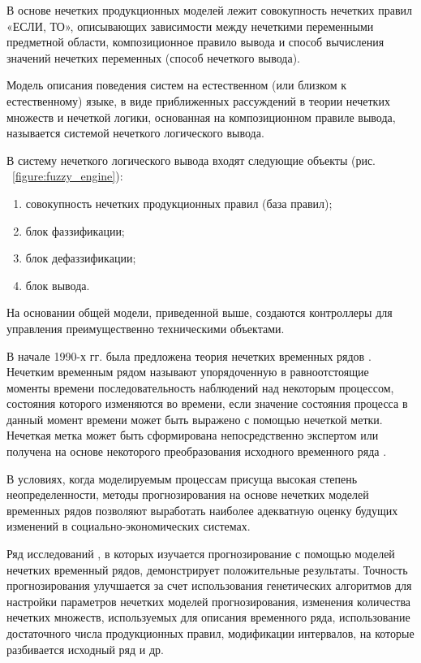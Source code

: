 В основе нечетких продукционных моделей лежит совокупность нечетких правил «ЕСЛИ, ТО», 
описывающих зависимости между нечеткими переменными предметной области, 
композиционное правило вывода и способ вычисления значений нечетких переменных (способ нечеткого вывода).

Модель описания поведения систем на естественном (или близком к естественному) языке,
в виде приближенных рассуждений в теории нечетких множеств и нечеткой логики,
основанная на композиционном правиле вывода, называется системой нечеткого логического вывода.

В систему нечеткого логического вывода входят следующие объекты (рис. ~\ref{figure:fuzzy_engine}):
\begin{enumerate} 
    \item совокупность нечетких продукционных правил (база правил);
    \item блок фаззификации;
    \item блок дефаззификации;
    \item блок вывода.
\end{enumerate}

На основании общей модели, приведенной выше, создаются контроллеры для управления преимущественно техническими объектами.

В начале 1990-х гг. была предложена теория нечетких временных рядов \cite{Song1993}. 
Нечетким временным рядом называют упорядоченную в равноотстоящие моменты времени последовательность наблюдений над некоторым процессом,
состояния которого изменяются во времени, если значение состояния процесса в данный момент времени может быть выражено с помощью нечеткой метки. 
Нечеткая метка может быть сформирована непосредственно экспертом или получена на основе некоторого преобразования исходного временного ряда \cite{Yarushkina2010}. 

В условиях, когда моделируемым процессам присуща высокая степень неопределенности, 
методы прогнозирования на основе нечетких моделей временных рядов позволяют выработать наиболее адекватную оценку будущих изменений в социально-экономических системах.

Ряд исследований \cite{Chen1996,S.Melike2008,Saxena2012}, в которых изучается прогнозирование с помощью моделей нечетких временный рядов, 
демонстрирует положительные результаты. 
Точность прогнозирования улучшается за счет использования генетических алгоритмов для настройки параметров нечетких моделей прогнозирования, 
изменения количества нечетких множеств, используемых для описания временного ряда, использование достаточного числа продукционных правил, 
модификации интервалов, на которые разбивается исходный ряд и др.

